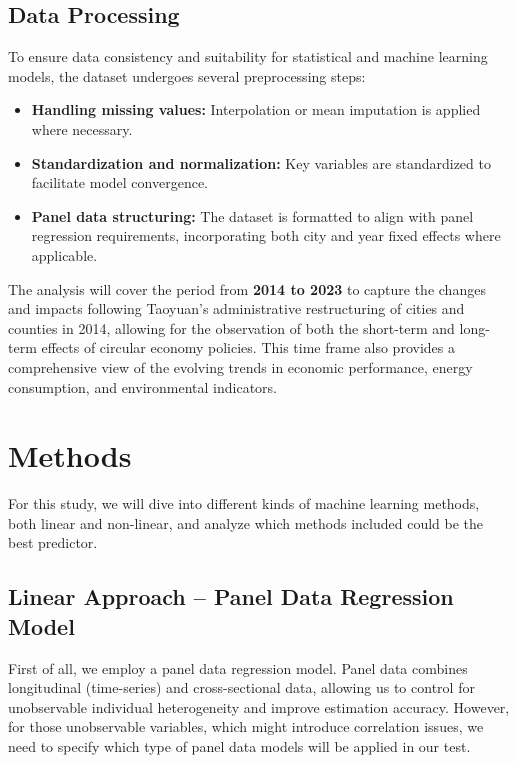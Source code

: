 \documentclass{article}
\begin{document}
\subsection{Data Processing}
To ensure data consistency and suitability for statistical and machine learning models, the dataset undergoes several preprocessing steps:
\begin{itemize}
    \item \textbf{Handling missing values:} Interpolation or mean imputation is applied where necessary.
    \item \textbf{Standardization and normalization:} Key variables are standardized to facilitate model convergence.
    \item \textbf{Panel data structuring:} The dataset is formatted to align with panel regression requirements, incorporating both city and year fixed effects where applicable.
\end{itemize}

The analysis will cover the period from \textbf{2014 to 2023} to capture the changes and impacts following Taoyuan's administrative restructuring of cities and counties in 2014, allowing for the observation of both the short-term and long-term effects of circular economy policies. This time frame also provides a comprehensive view of the evolving trends in economic performance, energy consumption, and environmental indicators.

\section{Methods}
For this study, we will dive into different kinds of machine learning methods, both linear and non-linear, and analyze which methods included could be the best predictor.
\subsection{Linear Approach -- Panel Data Regression Model}
First of all, we employ a panel data regression model. Panel data combines longitudinal (time-series) and cross-sectional data, allowing us to control for unobservable individual heterogeneity and improve estimation accuracy.
However, for those unobservable variables, which might introduce correlation issues, we need to specify which type of panel data models will be applied in our test.
\end{document}
